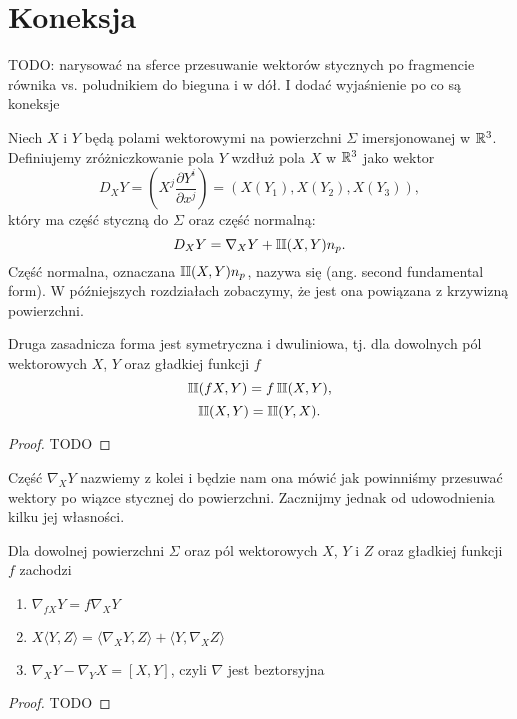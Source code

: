 \section{Koneksja}

{\color{red}TODO: narysować na sferce przesuwanie wektorów stycznych po fragmencie równika vs. poludnikiem do bieguna i w dół. I dodać wyjaśnienie po co są koneksje}

Niech $X$ i $Y$ będą polami wektorowymi na powierzchni $\Sigma$ imersjonowanej w $\mathbb{R}^3$. Definiujemy zróżniczkowanie pola $Y$ wzdłuż pola $X$ w $\mathbb{R}^3$ jako wektor
$$D_XY=\left(X^j\frac{\partial Y^i}{\partial x^j}\right)=(X(Y_1), X(Y_2), X(Y_3)),$$
który ma część styczną do $\Sigma$ oraz część normalną:
$$D_XY=\nabla_XY+\operatorname{\mathbb{II}}(X,Y)n_p.$$
Część normalna, oznaczana $\operatorname{\mathbb{II}}(X,Y)n_p$, nazywa się  (ang. second fundamental form). W późniejszych rozdziałach zobaczymy, że jest ona powiązana z krzywizną powierzchni. 

\begin{lemma}{}{}
  Druga zasadnicza forma jest symetryczna i dwuliniowa, tj. dla dowolnych pól wektorowych $X$, $Y$ oraz gładkiej funkcji $f$
  $$\operatorname{\mathbb{II}}(fX,Y)=f\operatorname{\mathbb{II}}(X,Y),$$
  $$\operatorname{\mathbb{II}}(X,Y)=\operatorname{\mathbb{II}}(Y, X).$$
\end{lemma}

\begin{proof}TODO
\end{proof}

Część $\nabla_XY$ nazwiemy z kolei  i będzie nam ona mówić jak powinniśmy przesuwać wektory po wiązce stycznej do powierzchni. Zacznijmy jednak od udowodnienia kilku jej własności.

\begin{lemma}{}{}
  Dla dowolnej powierzchni $\Sigma$ oraz pól wektorowych $X$, $Y$ i $Z$ oraz gładkiej funkcji $f$ zachodzi
  \begin{enumerate}
    \item $\nabla_{fX}Y=f\nabla_XY$
    \item $X\langle Y,Z\rangle=\langle\nabla_XY, Z\rangle+\langle Y, \nabla_XZ\rangle$
    \item $\nabla_XY-\nabla_YX=[X,Y]$, czyli $\nabla$ jest beztorsyjna
  \end{enumerate}
\end{lemma}

\begin{proof}TODO
\end{proof}


